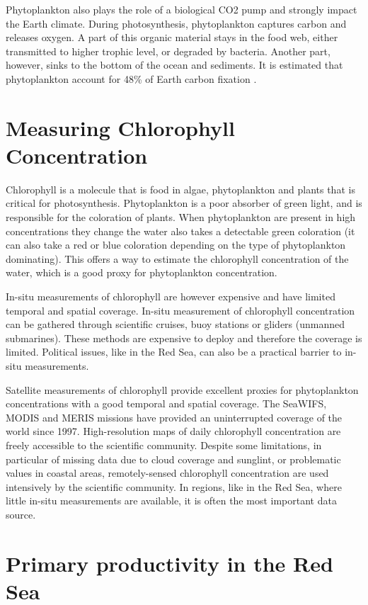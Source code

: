 Phytoplankton also plays the role of a biological CO2 pump and strongly impact the Earth climate. During photosynthesis, phytoplankton captures carbon and releases oxygen. A part of this organic material stays in the food web, either transmitted to higher trophic level, or degraded  by bacteria. Another part, however, sinks to the bottom of the ocean and sediments. It is estimated that phytoplankton account for 48\% of Earth carbon fixation \cite{Pal2014}.

\section{Measuring Chlorophyll Concentration}

Chlorophyll is a molecule that is food in algae, phytoplankton and plants that is critical for photosynthesis. Phytoplankton is a poor absorber of green light, and is responsible for the coloration of plants. When phytoplankton are present in high concentrations they change the water also takes a detectable green coloration (it can also take a red or blue coloration depending on the type of phytoplankton dominating). This offers a way to estimate the chlorophyll concentration of the water, which is a good proxy for phytoplankton concentration. 

In-situ measurements of chlorophyll are however expensive and have limited temporal and spatial coverage. In-situ measurement of chlorophyll concentration can be gathered through scientific cruises, buoy stations or gliders (unmanned submarines). These methods are expensive to deploy and therefore the coverage is limited. Political issues, like in the Red Sea, can also be a practical barrier to in-situ measurements. 

Satellite measurements of chlorophyll provide excellent proxies for phytoplankton concentrations with a good temporal and spatial coverage. The SeaWIFS, MODIS and MERIS missions have provided an uninterrupted coverage of the world since 1997. High-resolution maps of daily chlorophyll concentration are freely accessible to the scientific community. Despite some limitations, in particular of missing data due to cloud coverage and sunglint, or problematic values in coastal areas, remotely-sensed chlorophyll concentration are used intensively by the scientific community. In regions, like in the Red Sea, where little in-situ measurements are available, it is often the most important data source. 

\section{Primary productivity in the Red Sea}

